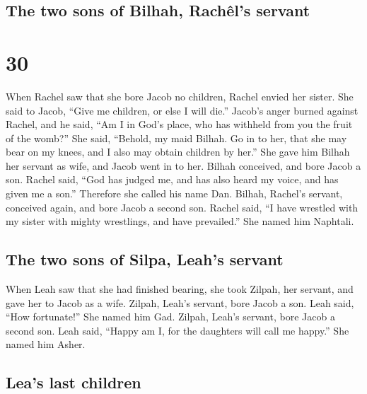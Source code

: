 \hypertarget{the-two-sons-of-bilhah-rachuxeals-servant}{%
\subsection{The two sons of Bilhah, Rachêl's
servant}\label{the-two-sons-of-bilhah-rachuxeals-servant}}

\hypertarget{section-29}{%
\section{30}\label{section-29}}

 When Rachel saw that she bore Jacob no children, Rachel
envied her sister. She said to Jacob, ``Give me children, or else I will
die.''  Jacob's anger burned against Rachel, and he said,
``Am I in God's place, who has withheld from you the fruit of the
womb?''  She said, ``Behold, my maid Bilhah. Go in to her,
that she may bear on my knees, and I also may obtain children by her.''
 She gave him Bilhah her servant as wife, and Jacob went
in to her.  Bilhah conceived, and bore Jacob a son.
 Rachel said, ``God has judged me, and has also heard my
voice, and has given me a son.'' Therefore she called his name Dan.
 Bilhah, Rachel's servant, conceived again, and bore Jacob
a second son.  Rachel said, ``I have wrestled with my
sister with mighty wrestlings, and have prevailed.'' She named him
Naphtali.

\hypertarget{the-two-sons-of-silpa-leahs-servant}{%
\subsection{The two sons of Silpa, Leah's
servant}\label{the-two-sons-of-silpa-leahs-servant}}

 When Leah saw that she had finished bearing, she took
Zilpah, her servant, and gave her to Jacob as a wife. 
Zilpah, Leah's servant, bore Jacob a son.  Leah said,
``How fortunate!'' She named him Gad.  Zilpah, Leah's
servant, bore Jacob a second son.  Leah said, ``Happy am
I, for the daughters will call me happy.'' She named him Asher.

\hypertarget{leas-last-children}{%
\subsection{Lea's last children}\label{leas-last-children}}

